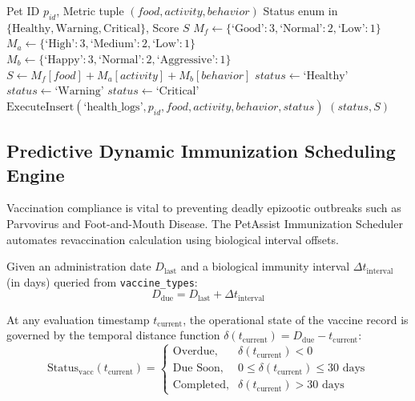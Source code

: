 \documentclass[conference]{IEEEtran}
\begin{document}
\begin{algorithm}[h]
\caption{Multi-Criteria Health and Mood Assessment}
\label{alg:health_scoring}
\begin{algorithmic}[1]
\REQUIRE Pet ID $p_{id}$, Metric tuple $(food, activity, behavior)$
\ENSURE Status enum in $\{\text{Healthy}, \text{Warning}, \text{Critical}\}$, Score $S$
\STATE $M_f \leftarrow \{\text{`Good'}: 3, \text{`Normal'}: 2, \text{`Low'}: 1\}$
\STATE $M_a \leftarrow \{\text{`High'}: 3, \text{`Medium'}: 2, \text{`Low'}: 1\}$
\STATE $M_b \leftarrow \{\text{`Happy'}: 3, \text{`Normal'}: 2, \text{`Aggressive'}: 1\}$
\STATE $S \leftarrow M_f[food] + M_a[activity] + M_b[behavior]$
    \STATE $status \leftarrow \text{`Healthy'}$
    \STATE $status \leftarrow \text{`Warning'}$
\ELSE
    \STATE $status \leftarrow \text{`Critical'}$
\ENDIF
\STATE $\text{ExecuteInsert}(\text{`health\_logs'}, p_{id}, food, activity, behavior, status)$
\RETURN $(status, S)$
\end{algorithmic}
\end{algorithm}

\subsection{Predictive Dynamic Immunization Scheduling Engine}
Vaccination compliance is vital to preventing deadly epizootic outbreaks such as Parvovirus and Foot-and-Mouth Disease. The PetAssist Immunization Scheduler automates revaccination calculation using biological interval offsets. 

Given an administration date $D_{\text{last}}$ and a biological immunity interval $\Delta t_{\text{interval}}$ (in days) queried from \texttt{vaccine\_types}:
\begin{equation}
D_{\text{due}} = D_{\text{last}} + \Delta t_{\text{interval}}
\end{equation}

At any evaluation timestamp $t_{\text{current}}$, the operational state of the vaccine record is governed by the temporal distance function $\delta(t_{\text{current}}) = D_{\text{due}} - t_{\text{current}}$:
\begin{equation}
\text{Status}_{\text{vacc}}(t_{\text{current}}) = \begin{cases} 
\text{Overdue}, & \delta(t_{\text{current}}) < 0 \\ 
\text{Due Soon}, & 0 \le \delta(t_{\text{current}}) \le 30 \text{ days} \\ 
\text{Completed}, & \delta(t_{\text{current}}) > 30 \text{ days} 
\end{cases}
\end{equation}
\end{document}

